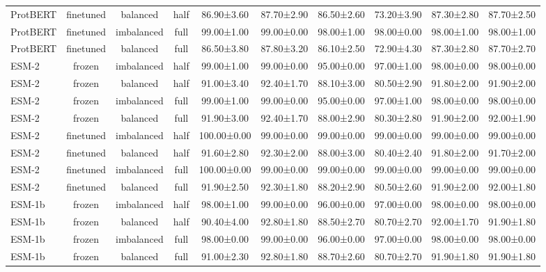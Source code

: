 \begin{tabular}{lccccccccc}
    ProtBERT &      finetuned &   balanced &      half &  86.90±3.60 &  87.70±2.90 &  86.50±2.60 &  73.20±3.90 &  87.30±2.80 &  87.70±2.50 \\
    ProtBERT &      finetuned & imbalanced &      full &  99.00±1.00 &  99.00±0.00 &  98.00±1.00 &  98.00±0.00 &  98.00±1.00 &  98.00±1.00 \\
    ProtBERT &      finetuned &   balanced &      full &  86.50±3.80 &  87.80±3.20 &  86.10±2.50 &  72.90±4.30 &  87.30±2.80 &  87.70±2.70 \\
       ESM-2 &         frozen & imbalanced &      half &  99.00±1.00 &  99.00±0.00 &  95.00±0.00 &  97.00±1.00 &  98.00±0.00 &  98.00±0.00 \\
       ESM-2 &         frozen &   balanced &      half &  91.00±3.40 &  92.40±1.70 &  88.10±3.00 &  80.50±2.90 &  91.80±2.00 &  91.90±2.00 \\
       ESM-2 &         frozen & imbalanced &      full &  99.00±1.00 &  99.00±0.00 &  95.00±0.00 &  97.00±1.00 &  98.00±0.00 &  98.00±0.00 \\
       ESM-2 &         frozen &   balanced &      full &  91.90±3.00 &  92.40±1.70 &  88.00±2.90 &  80.30±2.80 &  91.90±2.00 &  92.00±1.90 \\
       ESM-2 &      finetuned & imbalanced &      half & 100.00±0.00 &  99.00±0.00 &  99.00±0.00 &  99.00±0.00 &  99.00±0.00 &  99.00±0.00 \\
       ESM-2 &      finetuned &   balanced &      half &  91.60±2.80 &  92.30±2.00 &  88.00±3.00 &  80.40±2.40 &  91.80±2.00 &  91.70±2.00 \\
       ESM-2 &      finetuned & imbalanced &      full & 100.00±0.00 &  99.00±0.00 &  99.00±0.00 &  99.00±0.00 &  99.00±0.00 &  99.00±0.00 \\
       ESM-2 &      finetuned &   balanced &      full &  91.90±2.50 &  92.30±1.80 &  88.20±2.90 &  80.50±2.60 &  91.90±2.00 &  92.00±1.80 \\
      ESM-1b &         frozen & imbalanced &      half &  98.00±1.00 &  99.00±0.00 &  96.00±0.00 &  97.00±0.00 &  98.00±0.00 &  98.00±0.00 \\
      ESM-1b &         frozen &   balanced &      half &  90.40±4.00 &  92.80±1.80 &  88.50±2.70 &  80.70±2.70 &  92.00±1.70 &  91.90±1.80 \\
      ESM-1b &         frozen & imbalanced &      full &  98.00±0.00 &  99.00±0.00 &  96.00±0.00 &  97.00±0.00 &  98.00±0.00 &  98.00±0.00 \\
      ESM-1b &         frozen &   balanced &      full &  91.00±2.30 &  92.80±1.80 &  88.70±2.60 &  80.70±2.70 &  91.90±1.80 &  91.90±1.80 \\

\end{tabular}
